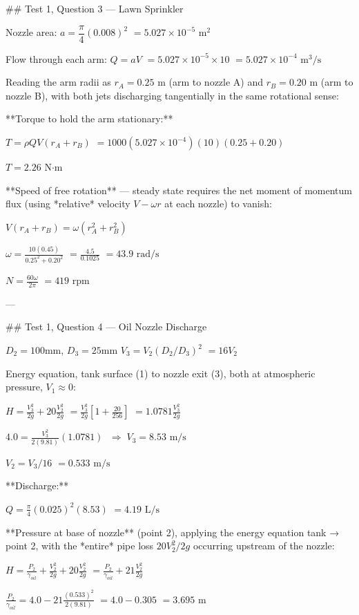 ## Test 1, Question 3 — Lawn Sprinkler

Nozzle area:
$a = \dfrac{\pi}{4}(0.008)^2$
$= 5.027\times10^{-5}\text{ m}^2$

Flow through each arm:
$Q = aV$
$= 5.027\times10^{-5}\times 10$
$= 5.027\times10^{-4}\text{ m}^3/\text{s}$

Reading the arm radii as $r_A = 0.25\text{ m}$ (arm to nozzle A) and $r_B = 0.20\text{ m}$ (arm to nozzle B), with both jets discharging tangentially in the same rotational sense:

**Torque to hold the arm stationary:**

$T = \rho Q V(r_A+r_B)$
$= 1000(5.027\times10^{-4})(10)(0.25+0.20)$

$T = \boxed{2.26 \text{ N·m}}$

**Speed of free rotation** — steady state requires the net moment of momentum flux (using *relative* velocity $V-\omega r$ at each nozzle) to vanish:

$V(r_A+r_B) = \omega(r_A^2+r_B^2)$

$\omega = \frac{10(0.45)}{0.25^2+0.20^2}$
$= \frac{4.5}{0.1025}$
$= 43.9\text{ rad/s}$

$N = \frac{60\omega}{2\pi}$
$= \boxed{419 \text{ rpm}}$

---

## Test 1, Question 4 — Oil Nozzle Discharge

$D_2 = 100\text{mm}$, $D_3=25\text{mm}$
$V_3 = V_2(D_2/D_3)^2$
$= 16V_2$

Energy equation, tank surface (1) to nozzle exit (3), both at atmospheric pressure, $V_1\approx0$:

$H = \frac{V_3^2}{2g} + 20\frac{V_2^2}{2g}$
$= \frac{V_3^2}{2g}\left[1+\frac{20}{256}\right]$
$= 1.0781\frac{V_3^2}{2g}$

$4.0 = \frac{V_3^2}{2(9.81)}(1.0781)$
$\;\Rightarrow\; V_3 = \boxed{8.53\text{ m/s}}$

$V_2 = V_3/16$
$= 0.533\text{ m/s}$

**Discharge:**

$Q = \frac{\pi}{4}(0.025)^2(8.53)$
$= \boxed{4.19\text{ L/s}}$

**Pressure at base of nozzle** (point 2), applying the energy equation tank → point 2, with the *entire* pipe loss $20V_2^2/2g$ occurring upstream of the nozzle:

$H = \frac{P_2}{\gamma_{oil}} + \frac{V_2^2}{2g} + 20\frac{V_2^2}{2g}$
$= \frac{P_2}{\gamma_{oil}} + 21\frac{V_2^2}{2g}$

$\frac{P_2}{\gamma_{oil}} = 4.0 - 21\frac{(0.533)^2}{2(9.81)}$
$= 4.0-0.305$
$= 3.695\text{ m}$

